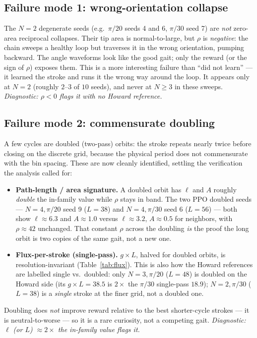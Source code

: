 \documentclass[11pt]{article}
\begin{document}
\subsection{Failure mode 1: wrong-orientation collapse}
\label{sec:failures}

The $N=2$ degenerate seeds (e.g.\ $\pi/20$ seeds 4 and 6, $\pi/30$ seed 7) are
\emph{not} zero-area reciprocal collapses. Their tip area is normal-to-large,
but $\rho$ is \emph{negative}: the chain sweeps a healthy loop but traverses it
in the wrong orientation, pumping backward. The angle waveforms look like the
good gait; only the reward (or the sign of $\rho$) exposes them. This is a more
interesting failure than ``did not learn'' --- it learned the stroke and runs
it the wrong way around the loop. It appears only at $N=2$ (roughly
$2$--$3$ of $10$ seeds), and never at $N\ge3$ in these sweeps. \emph{Diagnostic:
$\rho<0$ flags it with no Howard reference.}

\subsection{Failure mode 2: commensurate doubling}
\label{sec:doubling}

A few cycles are doubled (two-pass) orbits: the stroke repeats nearly twice
before closing on the discrete grid, because the physical period does not
commensurate with the bin spacing. These are now cleanly identified, settling
the verification the analysis called for:
\begin{itemize}[leftmargin=2em]
\item \textbf{Path-length / area signature.} A doubled orbit has
$\ell$ and $A$ roughly \emph{double} the in-family value while $\rho$ stays in
band. The two PPO doubled seeds --- $N=4,\pi/20$ seed 9 ($L=38$) and
$N=4,\pi/30$ seed 6 ($L=56$) --- both show $\ell\approx 6.3$ and $A\approx 1.0$
versus $\ell\approx 3.2$, $A\approx 0.5$ for neighbors, with $\rho\approx 42$
unchanged. That constant $\rho$ across the doubling \emph{is} the proof the long
orbit is two copies of the same gait, not a new one.
\item \textbf{Flux-per-stroke (single-pass).} $g\times L$, halved for doubled
orbits, is resolution-invariant (Table~\ref{tab:flux}). This is also how the
Howard references are labelled single vs.\ doubled: only $N=3,\pi/20$ ($L=48$)
is doubled on the Howard side (its $g\times L=38.5$ is $2\times$ the $\pi/30$
single-pass $18.9$); $N=2,\pi/30$ ($L=38$) is a \emph{single} stroke at the
finer grid, not a doubled one.
\end{itemize}
Doubling does \emph{not} improve reward relative to the best shorter-cycle
strokes --- it is neutral-to-worse --- so it is a rare curiosity, not a
competing gait. \emph{Diagnostic: $\ell$ (or $L$) $\approx 2\times$ the
in-family value flags it.}
\end{document}
